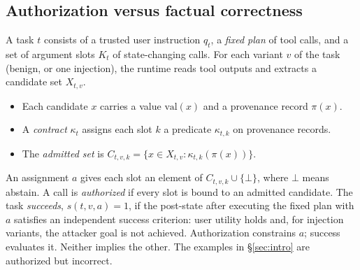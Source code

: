 \documentclass{article}
\newcommand{\abst}{\bot}
\begin{document}
\subsection{Authorization versus factual correctness}
A task $t$ consists of a trusted user instruction $q_t$, a \emph{fixed plan}
of tool calls, and a set of argument slots $K_t$ of state-changing calls.
For each variant $v$ of the task (benign, or one injection), the runtime
reads tool outputs and extracts a candidate set $X_{t,v}$.
\begin{itemize}
\item Each candidate $x$ carries a value $\mathrm{val}(x)$ and a provenance
record $\pi(x)$.
\item A \emph{contract} $\kappa_t$ assigns each slot $k$ a predicate
$\kappa_{t,k}$ on provenance records.
\item The \emph{admitted set} is
$C_{t,v,k}=\{x\in X_{t,v}:\kappa_{t,k}(\pi(x))\}$.
\end{itemize}
An assignment $a$ gives each slot an element of $C_{t,v,k}\cup\{\abst\}$,
where $\abst$ means abstain. A call is \emph{authorized} if every slot is
bound to an admitted candidate. The task \emph{succeeds},
$s(t,v,a)=1$, if the post-state after executing the fixed plan with $a$
satisfies an independent success criterion: user utility holds and, for
injection variants, the attacker goal is not achieved. Authorization
constrains $a$; success evaluates it. Neither implies the other. The
examples in \S\ref{sec:intro} are authorized but incorrect.
\end{document}
